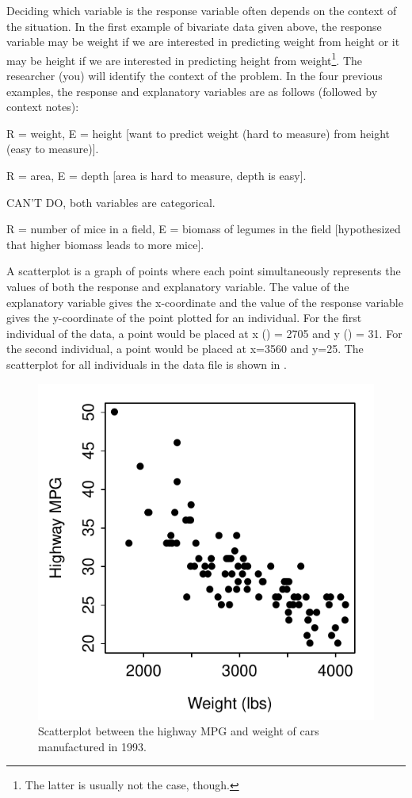 \documentclass[10pt,openany]{book}\usepackage[]{graphicx}\usepackage[]{color}
\newenvironment{knitrout}{}{} %
\begin{document}
Deciding which variable is the response variable often depends on the context of the situation.  In the first example of bivariate data given above, the response variable may be weight if we are interested in predicting weight from height or it may be height if we are interested in predicting height from weight\footnote{The latter is usually not the case, though.}.  The researcher (you) will identify the context of the problem.  In the four previous examples, the response and explanatory variables are as follows (followed by context notes):
\begin{Itemize}
  \item R = weight, E = height [want to predict weight (hard to measure) from height (easy to measure)].
  \item R = area, E = depth [area is hard to measure, depth is easy].
  \item CAN'T DO, both variables are categorical.
  \item R = number of mice in a field, E = biomass of legumes in the field [hypothesized that higher biomass leads to more mice].
\end{Itemize}


A scatterplot is a graph of points where each point simultaneously represents the values of both the response and explanatory variable.  The value of the explanatory variable gives the x-coordinate and the value of the response variable gives the y-coordinate of the point plotted for an individual.  For the first individual of the  data, a point would be placed at x () = 2705 and y () = 31.  For the second individual, a point would be placed at x=3560 and y=25.  The scatterplot for all individuals in the data file is shown in .
\begin{knitrout}
\color{fgcolor}\begin{figure}[hbtp]

{\centering \includegraphics[width=.4\linewidth]{Figs/carscat1-1} 

}

\caption[Scatterplot between the highway MPG and weight of cars manufactured in 1993]{Scatterplot between the highway MPG and weight of cars manufactured in 1993.}\label{fig:carscat1}
\end{figure}


\end{knitrout}
\end{document}
